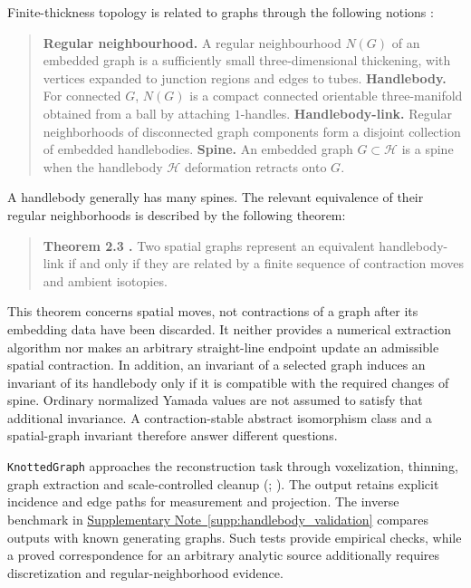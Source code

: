 \documentclass[10pt,twocolumn]{article}
\providecommand{\SuppSubsecref}[1]{\hyperref[#1]{Supplementary Note~\ref*{#1}}}
\begin{document}
Finite-thickness topology is related to graphs through the following notions \cite{kg_ishii2008handlebody,kg_ishii2012handlebody}:
\begin{quote}
\textbf{Regular neighbourhood.} A regular neighbourhood $N(G)$ of an embedded graph is a sufficiently small three-dimensional thickening, with vertices expanded to junction regions and edges to tubes.
\medskip
\noindent\textbf{Handlebody.} For connected $G$, $N(G)$ is a compact connected orientable three-manifold obtained from a ball by attaching $1$-handles.
\medskip
\noindent\textbf{Handlebody-link.} Regular neighborhoods of disconnected graph components form a disjoint collection of embedded handlebodies.
\medskip
\noindent\textbf{Spine.} An embedded graph $G\subset\mathcal H$ is a spine when the handlebody $\mathcal H$ deformation retracts onto $G$.
\end{quote}

A handlebody generally has many spines. The relevant equivalence of their regular neighborhoods is described by the following theorem:
\begin{quote}
\textbf{Theorem 2.3 \cite[Theorem~2.3]{kg_ishii2012handlebody}.}
Two spatial graphs represent an equivalent handlebody-link if and only if they are related by a finite sequence of contraction moves and ambient isotopies.
\end{quote}
This theorem concerns spatial moves, not contractions of a graph after its embedding data have been discarded. It neither provides a numerical extraction algorithm nor makes an arbitrary straight-line endpoint update an admissible spatial contraction. In addition, an invariant of a selected graph induces an invariant of its handlebody only if it is compatible with the required changes of spine. Ordinary normalized Yamada values are not assumed to satisfy that additional invariance. A contraction-stable abstract isomorphism class and a spatial-graph invariant therefore answer different questions.

\texttt{KnottedGraph} approaches the reconstruction task through voxelization, thinning, graph extraction and scale-controlled cleanup (; ). The output retains explicit incidence and edge paths for measurement and projection. The inverse benchmark in \SuppSubsecref{supp:handlebody_validation} compares outputs with known generating graphs. Such tests provide empirical checks, while a proved correspondence for an arbitrary analytic source additionally requires discretization and regular-neighborhood evidence.
\end{document}
